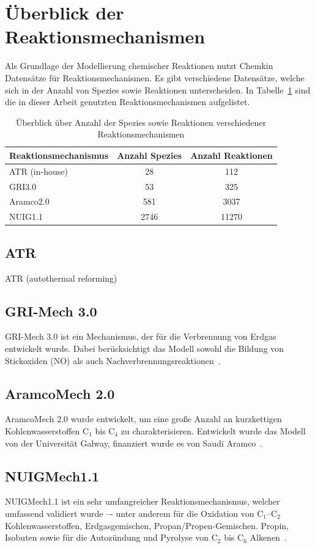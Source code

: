\documentclass[footmark=none]{tubaf-thesis}
\begin{document}
    \section{Überblick der Reaktionsmechanismen}
    Als Grundlage der Modellierung chemischer Reaktionen nutzt Chemkin Datensätze für Reaktionsmechanismen. Es gibt verschiedene Datensätze, welche sich in der Anzahl von Spezies sowie Reaktionen unterscheiden. In Tabelle~\ref{tab:reaktionsmechanismen_überblick} sind die in dieser Arbeit genutzten Reaktionsmechanismen aufgelistet. 
    \begin{table}[H]
        \centering
        \begin{tabular}{lcc}
        \toprule
        \textbf{Reaktionsmechanismus} & \textbf{Anzahl Spezies} & \textbf{Anzahl Reaktionen} \\
        \midrule
        ATR (in-house) & 28 & 112 \\
        GRI3.0         & 53 & 325 \\
        Aramco2.0      & 581 & 3037 \\
        NUIG1.1        & 2746 & 11270 \\
        \bottomrule
        \end{tabular}
        \caption{Überblick über Anzahl der Spezies sowie Reaktionen verschiedener Reaktionsmechanismen}\label{tab:reaktionsmechanismen_überblick}
    \end{table}
    \subsection*{ATR}
        ATR (autothermal reforming) 
    \subsection*{GRI-Mech 3.0}
        GRI-Mech 3.0 ist ein Mechanismus, der für die Verbrennung von Erdgas entwickelt wurde. Dabei berücksichtigt das Modell sowohl die Bildung von Stickoxiden (NO) als auch Nachverbrennungsreaktionen~\cite{Gri-Mech}.
    \subsection*{AramcoMech 2.0}
        AramcoMech 2.0 wurde entwickelt, um eine große Anzahl an kurzkettigen Kohlenwasserstoffen C$_1$ bis C$_4$ zu charakterisieren. Entwickelt wurde das Modell von der Universität Galway, finanziert wurde es von Saudi Aramco~\cite{Aramco20}. 
    \subsection*{NUIGMech1.1}
        NUIGMech1.1 ist ein sehr umfangreicher Reaktionsmechanismus, welcher umfassend validiert wurde –- unter anderem für die Oxidation von C$_1$--C$_2$ Kohlenwasserstoffen, Erdgasgemischen, Propan/Propen-Gemischen. Propin, Isobuten sowie für die Autozündung und Pyrolyse von C$_2$ bis C$_6$ Alkenen~\cite{MARTINEZ2021401}.
\end{document}
